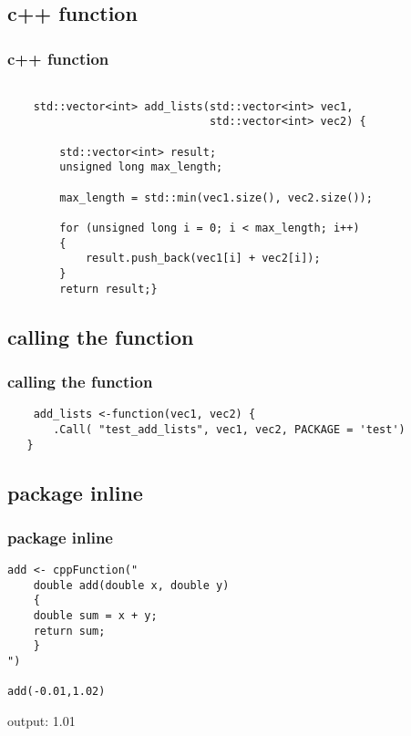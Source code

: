 \documentclass[hyperef={
    colorlinks=true,
    linkcolor=blue,
    filecolor=black,
urlcolor=blue}
]{beamer}
\begin{document}
\subsection{c++ function}
\begin{frame}[fragile]
\frametitle{c++ function}
\begin{verbatim}

    std::vector<int> add_lists(std::vector<int> vec1,
                               std::vector<int> vec2) {
        
        std::vector<int> result;
        unsigned long max_length;
        
        max_length = std::min(vec1.size(), vec2.size());
        
        for (unsigned long i = 0; i < max_length; i++)
        {
            result.push_back(vec1[i] + vec2[i]);
        }
        return result;}

\end{verbatim} 
\end{frame}

\subsection{calling the function}
\begin{frame}[fragile]
\frametitle{calling the function}

\begin{verbatim}
    add_lists <-function(vec1, vec2) {
       .Call( "test_add_lists", vec1, vec2, PACKAGE = 'test')
   }
\end{verbatim}

\end{frame}

\subsection{package inline}
\begin{frame}[fragile]
\frametitle{package inline}
\begin{verbatim}
add <- cppFunction("
    double add(double x, double y)
    {
    double sum = x + y;
    return sum;
    }
")

add(-0.01,1.02)
\end{verbatim}
output:
1.01
\end{frame}
\end{document}
